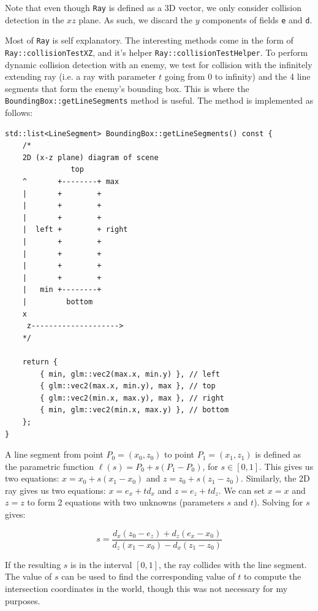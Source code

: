 \documentclass {article}
\begin{document}
Note that even though \texttt{Ray} is defined as a 3D vector, we only consider collision detection in the $xz$ plane. As such, we discard the $y$ components of fields \texttt{e} and \texttt{d}.

Most of \texttt{Ray} is self explanatory. The interesting methods come in the form of \texttt{Ray::collisionTestXZ}, and it's helper \texttt{Ray::collisionTestHelper}. To perform dynamic collision detection with an enemy, we test for collision with the infinitely extending ray (i.e. a ray with parameter $t$ going from $0$ to infinity) and the 4 line segments that form the enemy's bounding box. This is where the \texttt{BoundingBox::getLineSegments} method is useful. The method is implemented as follows:
\begin{verbatim}
std::list<LineSegment> BoundingBox::getLineSegments() const {
    /*
    2D (x-z plane) diagram of scene
               top
    ^       +--------+ max
    |       +        +
    |       +        +
    |       +        +
    |  left +        + right
    |       +        +
    |       +        +
    |       +        +
    |       +        +
    |   min +--------+
    |         bottom
    x
     z-------------------->
    */

    return {
        { min, glm::vec2(max.x, min.y) }, // left
        { glm::vec2(max.x, min.y), max }, // top
        { glm::vec2(min.x, max.y), max }, // right
        { min, glm::vec2(min.x, max.y) }, // bottom
    };
}
\end{verbatim}

A line segment from point $P_0 = (x_0, z_0)$ to point $P_1 = (x_1, z_1)$ is defined as the parametric function $\ell (s) = P_0 + s(P_1 - P_0)$, for $s \in [0, 1]$. This gives us two equations: $x = x_0 + s(x_1 - x_0)$ and $z = z_0 + s(z_1 - z_0)$. Similarly, the 2D ray gives us two equations: $x = e_x + t d_x$ and $z = e_z + t d_z$. We can set $x = x$ and $z = z$ to form 2 equations with two unknowns (parameters $s$ and $t$). Solving for $s$ gives:

\[
s = \frac{d_x (z_0 - e_z) + d_z (e_x - x_0)}{d_z (x_1 - x_0) - d_x (z_1 - z_0)}
\]

If the resulting $s$ is in the interval $[0, 1]$, the ray collides with the line segment. The value of $s$ can be used to find the corresponding value of $t$ to compute the intersection coordinates in the world, though this was not necessary for my purposes.
\end{document}
